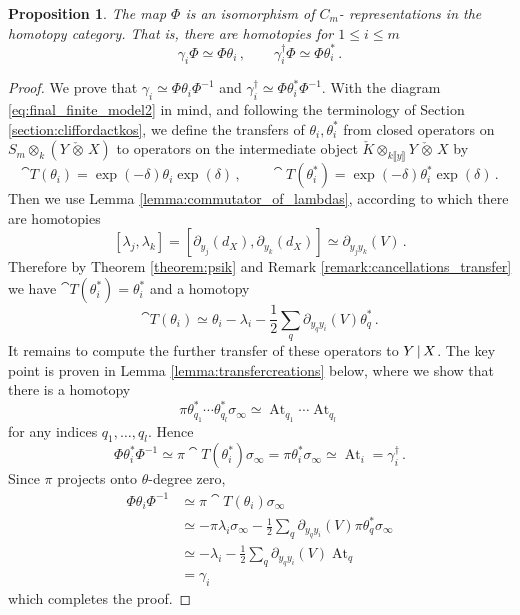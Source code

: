 \documentclass[english,letter paper,12pt,leqno]{article}
\newtheorem{proposition}[theorem]{Proposition}
\theoremstyle{example}
\numberwithin{equation}{section}
\def\be{\begin{equation}}
\def\ee{\end{equation}}
\DeclareMathOperator{\At}{At}
\begin{document}
\begin{proposition}\label{prop:clifford_action} The map $\Phi$ is an isomorphism of $C_m$- representations in the homotopy category. That is, there are homotopies for $1 \le i \le m$
\[
\gamma_i \Phi \simeq \Phi \theta_i \,, \qquad \gamma_i^\dagger \Phi \simeq \Phi \theta_i^*\,.
\]
\end{proposition}
\begin{proof}
We prove that $\gamma_i \simeq \Phi \theta_i \Phi^{-1}$ and $\gamma_i^\dagger \simeq \Phi \theta_i^* \Phi^{-1}$. With the diagram \eqref{eq:final_finite_model2} in mind, and following the terminology of Section \ref{section:cliffordactkos}, we define the transfers of $\theta_i, \theta_i^*$ from closed operators on $S_m \otimes_k ( Y \,\check{\otimes}\, X )$ to operators on the intermediate object $\check{K} \otimes_{k\llbracket y \rrbracket} Y \,\check{\otimes}\, X$ by
\[
\cat{T}(\theta_i) = \exp(-\delta) \theta_i \exp(\delta)\,, \qquad \cat{T}(\theta_i^*) = \exp(-\delta) \theta_i^* \exp(\delta)\,.
\]
Then we use Lemma \ref{lemma:commutator_of_lambdas}, according to which there are homotopies
\[
[ \lambda_j, \lambda_k ] = [ \partial_{y_j}(d_X), \partial_{y_k}(d_X) ] \simeq \partial_{y_jy_k}(V)\,.
\]
Therefore by Theorem \ref{theorem:psik} and Remark \ref{remark:cancellations_transfer} we have $\cat{T}(\theta_i^*) = \theta_i^*$ and a homotopy
\be\label{eq:comp338h}
\cat{T}(\theta_i) \simeq \theta_i - \lambda_i - \frac{1}{2}\sum_q \partial_{y_q y_i}(V) \theta_q^*\,.
\ee
It remains to compute the further transfer of these operators to $Y \,|\, X$. The key point is proven in Lemma \ref{lemma:transfercreations} below, where we show that there is a homotopy
\be\label{eq:transfercr}
\pi \theta_{q_1}^* \cdots \theta_{q_l}^* \sigma_\infty \simeq \At_{q_1} \cdots \At_{q_l}
\ee
for any indices $q_1,\ldots,q_l$. Hence
\[
\Phi \theta_i^* \Phi^{-1} \simeq \pi \cat{T}(\theta_i^*) \sigma_\infty = \pi \theta_i^* \sigma_\infty \simeq \At_i = \gamma_i^\dagger\,.
\]
Since $\pi$ projects onto $\theta$-degree zero,
\begin{align*}
\Phi \theta_i \Phi^{-1} &\simeq \pi \cat{T}(\theta_i) \sigma_\infty\\
&\simeq - \pi \lambda_i \sigma_\infty - \frac{1}{2} \sum_q \partial_{y_qy_i}(V) \pi \theta_q^* \sigma_\infty\\
&\simeq - \lambda_i - \frac{1}{2}\sum_q \partial_{y_qy_i}(V) \At_q\\
&= \gamma_i
\end{align*}
which completes the proof.
\end{proof}
\end{document}
